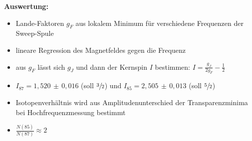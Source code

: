 \textbf{Auswertung:}
\begin{itemize}
    \item Lande-Faktoren $g_F$ aus lokalem Minimum für verschiedene Frequenzen der Sweep-Spule
    \item lineare Regression des Magnetfeldes gegen die Frequenz
    \item aus $g_F$ lässt sich $g_J$ und dann der Kernspin $I$ bestimmen: $I=\frac{g_J}{2g_F}-\frac{1}{2}$
    \item $I_{87} = 1,520\,\pm\,0,016$ (soll $\sfrac{3}{2}$) und $I_{85} = 2,505\,\pm\,0,013$ (soll $\sfrac{5}{2}$)
    \item Isotopenverhältnis wird aus Amplitudenunterschied der Transparenzminima bei Hochfrequenzmessung bestimmt
    \item $\frac{N(85)}{N(87)}\approx 2$
\end{itemize}
